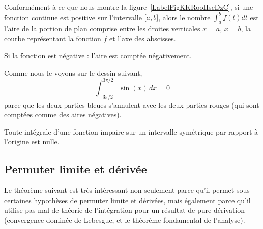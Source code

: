 \begin{remark}
    Conformément à ce que nous montre la figure~\ref{LabelFigKKRooHseDzC}, si une fonction continue est positive sur l'intervalle \( \mathopen[ a , b \mathclose]\), alors le nombre \( \int_a^bf(t)dt\) est l'aire de la portion de plan comprise entre les droites verticales \( x=a\), \( x=b\), la courbe représentant la fonction \( f\) et l'axe des abscisses.

    Si la fonction est négative : l'aire est comptée négativement.
\end{remark}

\begin{example}
    Comme nous le voyons sur le dessin suivant,
    \begin{equation}
        \int_{-3\pi/2}^{3\pi/2}\sin(x)\,dx=0
    \end{equation}
    parce que les deux parties bleues s'annulent avec les deux parties rouges (qui sont comptées comme des aires négatives).
    \begin{center}
       
    \end{center}
\end{example}

\begin{remark}
  Toute intégrale d'une fonction impaire sur un intervalle symétrique par rapport à l'origine est nulle.
\end{remark}

\subsection{Permuter limite et dérivée}

Le théorème suivant est très intéressant non seulement parce qu'il permet sous certaines hypothèses de permuter limite et dérivées, mais également parce qu'il utilise pas mal de théorie de l'intégration pour un résultat de pure dérivation (convergence dominée de Lebesgue, et le théorème fondamental de l'analyse). 

